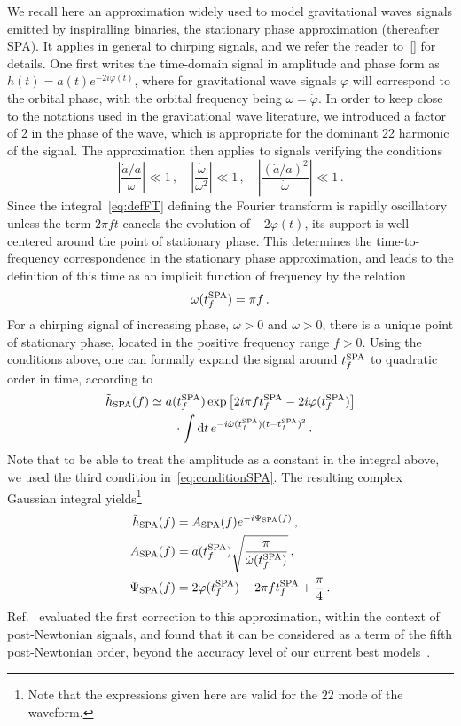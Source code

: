 \documentclass[aps,showpacs,twocolumn,
prd,superscriptaddress,nofootinbib]{revtex4-1}
\newcommand{\be}{\begin{equation}}
\newcommand{\ee}{\end{equation}}
\newcommand\ud{{\mathrm{d}}}
\newcommand{\nn}{\nonumber}
\begin{document}
We recall here an approximation widely used to model gravitational waves signals emitted by inspiralling binaries, the stationary phase approximation (thereafter SPA). It applies in general to chirping signals, and we refer the reader to~\ref{} for details. One first writes the time-domain signal in amplitude and phase form as $h(t) = a(t) e^{-2i\varphi(t)}$, where for gravitational wave signals $\varphi$ will correspond to the orbital phase, with the orbital frequency being $\omega = \dot{\varphi}$. In order to keep close to the notations used in the gravitational wave literature, we introduced a factor of 2 in the phase of the wave, which is appropriate for the dominant 22 harmonic of the signal. The approximation then applies to signals verifying the conditions
\be\label{eq:conditionSPA}
	\left| \frac{\dot{a}/a}{\omega} \right| \ll 1\,, \quad \left|\frac{\dot{\omega}}{\omega^{2}} \right| \ll 1\,, \quad \left| \frac{(\dot{a}/a)^{2}}{\dot{\omega}} \right| \ll 1 \,.
\ee
Since the integral~\eqref{eq:defFT} defining the Fourier transform is rapidly oscillatory unless the term $2\pi f t$ cancels the evolution of $-2\varphi(t)$, its support is well centered around the point of stationary phase. This determines the time-to-frequency correspondence in the stationary phase approximation, and leads to the definition of this time as an implicit function of frequency by the relation
\be\label{eq:deftfSPA}
	\omega(t_{f}^{\rm SPA}) = \pi  f \,.
\ee
For a chirping signal of increasing phase, $\omega>0$ and $\dot{\omega}>0$, there is a unique point of stationary phase, located in the positive frequency range $f>0$. Using the conditions above, one can formally expand the signal around $t_{f}^{\rm SPA}$ to quadratic order in time, according to
\begin{align}
	\tilde{h}_{\rm SPA} (f) &\simeq a(t_{f}^{\rm SPA}) \exp\left[2i\pi f t_{f}^{\rm SPA}-2i\varphi(t_{f}^{\rm SPA}) \right] \nn\\
	& \qquad \cdot \int \ud t \, e^{-i \dot{\omega} (t_{f}^{\rm SPA}) (t-t_{f}^{\rm SPA})^{2}} \,.
\end{align}
Note that to be able to treat the amplitude as a constant in the integral above, we used the third condition in~\eqref{eq:conditionSPA}. The resulting complex Gaussian integral yields\footnote{Note that the expressions given here are valid for the $22$ mode of the waveform.}
\begin{subequations}
\begin{align}
	\tilde{h}_{\rm SPA}(f) &= A_{\rm SPA}(f) e^{-i\Psi_{\rm SPA}(f)} \,, \\
	A_{\rm SPA}(f) &= a(t_{f}^{\rm SPA}) \sqrt{\frac{\pi}{\dot{\omega}(t_{f}^{\rm SPA})}} \,, \\
	\Psi_{\rm SPA}(f) &= 2\varphi(t_{f}^{\rm SPA}) - 2\pi f t_{f}^{\rm SPA} + \frac{\pi}{4} \,.
\end{align}
\end{subequations}
Ref.~\cite{Droz+99} evaluated the first correction to this approximation, within the context of post-Newtonian signals, and found that it can be considered as a term of the fifth post-Newtonian order, beyond the accuracy level of our current best models~\cite{BlanchetLiving}.
\end{document}
